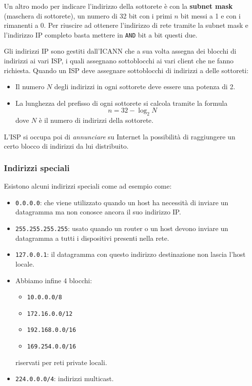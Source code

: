 Un altro modo per indicare l'indirizzo della sottorete è con la 
\textbf{subnet mask} (maschera di sottorete), un numero di 32 bit con
i primi $n$ bit messi a 1 e con i rimanenti a 0. Per riuscire ad
ottenere l'indirizzo di rete tramite la subnet mask e l'indirizzo IP
completo basta mettere in \verb|AND| bit a bit questi due.

Gli indirizzi IP sono gestiti dall'ICANN che a sua volta assegna dei 
blocchi di indirizzi ai vari ISP, i quali assegnano sottoblocchi ai 
vari client che ne fanno richiesta. Quando un ISP deve assegnare 
sottoblocchi di indirizzi a delle sottoreti:
\begin{itemize}
	\item Il numero $N$ degli indirizzi in ogni sottorete deve essere
		una potenza di 2.
	\item La lunghezza del prefisso di ogni sottorete si calcola 
		tramite la formula
		\[ n = 32 - \log_2 N \]
		dove $N$ è il numero di indirizzi della sottorete.
\end{itemize}
L'ISP si occupa poi di \emph{annunciare} su Internet la possibilità di
raggiungere un certo blocco di indirizzi da lui distribuito.

\subsubsection{Indirizzi speciali}
Esistono alcuni indirizzi speciali come ad esempio come:
\begin{itemize}
	\item \verb|0.0.0.0|: che viene utilizzato quando un host ha 
		necessità di inviare un datagramma ma non conosce ancora il 
		suo indirizzo IP.
	\item \verb|255.255.255.255|: usato quando un router o un host 
		devono inviare un datagramma a tutti i dispositivi presenti 
		nella rete.
	\item \verb|127.0.0.1|: il datagramma con questo indirizzo 
		destinazione non lascia l'host locale.
	\item Abbiamo infine 4 blocchi:
		\begin{itemize}
			\item \verb|10.0.0.0/8|
			\item \verb|172.16.0.0/12|
			\item \verb|192.168.0.0/16|
			\item \verb|169.254.0.0/16|
		\end{itemize}
		riservati per reti private locali.
	\item \verb|224.0.0.0/4|: indirizzi multicast.
\end{itemize}

